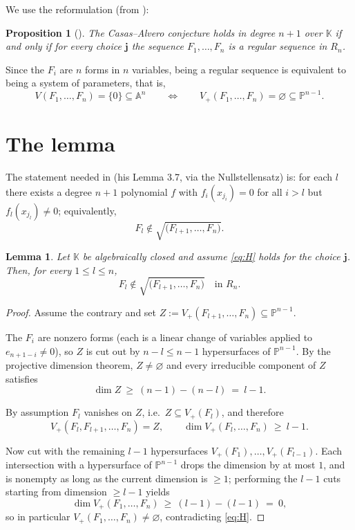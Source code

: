 \documentclass[11pt,reqno]{amsart}
\theoremstyle{plain}
\newtheorem{lemma}[theorem]{Lemma}
\newtheorem{proposition}[theorem]{Proposition}
\theoremstyle{definition}
\newcommand{\PP}{\mathbb{P}}
\newcommand{\AAA}{\mathbb{A}}
\newcommand{\KK}{\mathbb{K}}
\newcommand{\bj}{\mathbf{j}}
\begin{document}
We use the reformulation \cite[Prop.~1.4]{Gho} (from \cite{Gho24}):

\begin{proposition}[\cite{Gho}]\label{prop:reform}
The Casas--Alvero conjecture holds in degree $n+1$ over $\KK$ if and only if for
every choice $\bj$ the sequence $F_1,\dots,F_n$ is a regular sequence in $R_n$.
\end{proposition}

Since the $F_i$ are $n$ forms in $n$ variables, being a regular sequence is
equivalent to being a system of parameters, that is,
\begin{equation}\label{eq:H}
  V(F_1,\dots,F_n)=\{0\}\subseteq\AAA^n
  \qquad\Longleftrightarrow\qquad
  V_+(F_1,\dots,F_n)=\varnothing\subseteq\PP^{n-1}. \tag{H}
\end{equation}

\section{The lemma}

The statement needed in \cite{Gho} (his Lemma 3.7, via the Nullstellensatz) is:
for each $l$ there exists a degree $n+1$ polynomial $f$ with $f_i(x_{j_i})=0$ for
all $i>l$ but $f_l(x_{j_l})\neq0$; equivalently,
\[
  F_l\notin\sqrt{\big(F_{l+1},\dots,F_n\big)} .
\]

\begin{lemma}\label{lem:alg}
Let $\KK$ be algebraically closed and assume \eqref{eq:H} holds for the choice
$\bj$. Then, for every $1\le l\le n$,
\[
  F_l\notin\sqrt{\big(F_{l+1},\dots,F_n\big)}\quad\text{in } R_n .
\]
\end{lemma}

\begin{proof}
Assume the contrary and set $Z:=V_+(F_{l+1},\dots,F_n)\subseteq\PP^{n-1}$.

The $F_i$ are nonzero forms (each is a linear change of variables applied to
$e_{n+1-i}\neq0$), so $Z$ is cut out by $n-l\le n-1$ hypersurfaces of
$\PP^{n-1}$. By the projective dimension theorem, $Z\neq\varnothing$ and every
irreducible component of $Z$ satisfies
\[
  \dim Z\ \ge\ (n-1)-(n-l)\ =\ l-1 .
\]

By assumption $F_l$ vanishes on $Z$, i.e.\ $Z\subseteq V_+(F_l)$, and therefore
\[
  V_+(F_l,F_{l+1},\dots,F_n)=Z,\qquad \dim V_+(F_l,\dots,F_n)\ \ge\ l-1 .
\]

Now cut with the remaining $l-1$ hypersurfaces $V_+(F_1),\dots,V_+(F_{l-1})$.
Each intersection with a hypersurface of $\PP^{n-1}$ drops the dimension by at
most $1$, and is nonempty as long as the current dimension is $\ge1$; performing
the $l-1$ cuts starting from dimension $\ge l-1$ yields
\[
  \dim V_+(F_1,\dots,F_n)\ \ge\ (l-1)-(l-1)\ =\ 0 ,
\]
so in particular $V_+(F_1,\dots,F_n)\neq\varnothing$, contradicting
\eqref{eq:H}.
\end{proof}
\end{document}
